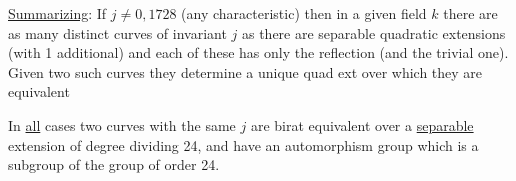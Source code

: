 \uline{Summarizing}: If $j\ne0,1728$ (any characteristic) then in a given field $k$ there are as many distinct curves of invariant $j$ as there are separable quadratic extensions (with 1 additional) and each of these has only the reflection  (and the trivial one). Given two such curves they determine a unique quad ext over which they are equivalent

In \uline{all} cases two curves with the same $j$ are birat equivalent over a \uline{separable} extension of degree dividing 24, and have an automorphism group which is a subgroup of the group of order 24.

